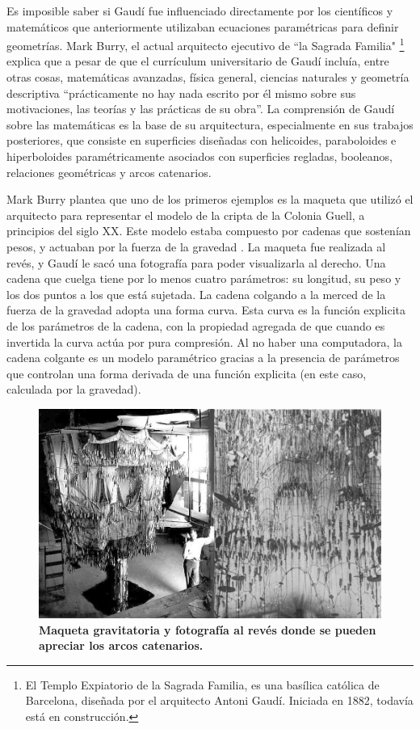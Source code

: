 Es imposible saber si Gaudí fue influenciado directamente por los científicos y matemáticos que anteriormente utilizaban ecuaciones paramétricas para definir geometrías. 
Mark Burry, el actual arquitecto ejecutivo de ``la Sagrada Familia" \footnote{El Templo Expiatorio de la Sagrada Familia, es una basílica católica de Barcelona, diseñada por el arquitecto Antoni Gaudí. Iniciada en 1882, todavía está en construcción.} explica que a pesar de que el currículum universitario de Gaudí incluía, entre otras cosas, matemáticas avanzadas, física general, ciencias naturales y geometría descriptiva ``prácticamente no hay nada escrito por él mismo sobre sus motivaciones, las teorías y las prácticas de su obra''. La comprensión de Gaudí sobre las matemáticas es la base de su arquitectura, especialmente en sus trabajos posteriores, que consiste en superficies diseñadas con helicoides, paraboloides e hiperboloides paramétricamente asociados con superficies regladas, booleanos, relaciones geométricas y arcos catenarios.

Mark Burry plantea que uno de los primeros ejemplos es la maqueta que utilizó el arquitecto para representar el modelo de la cripta de la Colonia Guell, a principios del siglo XX. Este modelo estaba compuesto por cadenas que sostenían pesos, y actuaban por la fuerza de la gravedad \citep{Kaled2016}.
La maqueta fue realizada al revés, y Gaudí le sacó una fotografía para poder visualizarla al derecho. Una cadena que cuelga tiene por lo menos cuatro parámetros: su longitud, su peso y los dos puntos a los que está sujetada. La cadena colgando a la merced de la fuerza de la gravedad adopta una forma curva. Esta curva es la función explicita de los parámetros de la cadena, con la propiedad agregada de que cuando es invertida la curva actúa por pura compresión. Al no haber una computadora, la cadena colgante es un modelo paramétrico gracias a la presencia de parámetros que controlan una forma derivada de una función explicita (en este caso, calculada por la gravedad). 


\begin{figure}[h]
\includegraphics[width=12cm]{Img/GEO/geo-gaudic.jpg}
\centering
\caption{\textbf{\footnotesize{Maqueta gravitatoria y fotografía al revés donde se pueden apreciar los arcos catenarios.}}}
\label{fig:gaudi}
\end{figure}





